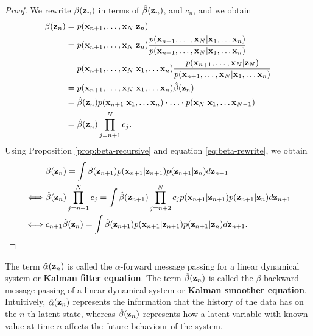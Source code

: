 \documentclass[12pt, oneside]{book}
\numberwithin{equation}{section}
\newcommand{\x}{{\bf x}}
\newcommand{\z}{{\bf z}}
\newtheorem{proposition}{Proposition}[section]
\begin{document}
{\begin{proof}
	We rewrite $\beta(\z_n)$ in terms of $\hat\beta(\z_n)$, and $c_n$, and we obtain
	\begin{align}
		\beta(\z_n) &= p(\x_{n+1}, \ldots, \x_N \vert \z_n)\\
		&= p(\x_{n+1}, \ldots, \x_N \vert \z_n) \frac{p(\x_{n+1}, \ldots, \x_N \vert \x_1, \ldots \x_n)}{p(\x_{n+1}, \ldots, \x_N \vert \x_1, \ldots \x_n)} \\
		&= p(\x_{n+1}, \ldots, \x_N \vert \x_1, \ldots \x_n) \frac{p(\x_{n+1}, \ldots, \x_N \vert \z_N)}{p(\x_{n+1}, \ldots, \x_N \vert \x_1, \ldots \x_n)}\\
		&= p(\x_{n+1}, \ldots, \x_N \vert \x_1, \ldots \x_n) \hat\beta(\z_n)\\
		&= \hat\beta(\z_n) p(\x_{n+1} \vert \x_1, \ldots \x_n) \cdot \ldots \cdot p(\x_{N} \vert \x_1, \ldots \x_{N-1})\\
		&= \hat\beta(\z_n) \prod_{j=n+1}^N c_j \label{eq:beta-rewrite}.
	\end{align}
	Using Proposition \ref{prop:beta-recursive} and equation \eqref{eq:beta-rewrite}, we obtain
	\begin{align}
		&\beta(\z_n) = \int  \beta(\z_{n+1})p(\x_{n+1}\vert \z_{n+1}) p(\z_{n+1}\vert \z_n) d\z_{n+1}\\
		\iff& \hat\beta(\z_n) \prod_{j=n+1}^N c_j = \int \hat\beta(\z_{n+1}) \prod_{j=n+2}^N c_jp(\x_{n+1}\vert \z_{n+1}) p(\z_{n+1}\vert \z_n) d\z_{n+1}\\
		\iff& c_{n+1} \hat\beta(\z_n) = \int  \hat\beta(\z_{n+1}) p(\x_{n+1}\vert \z_{n+1}) p(\z_{n+1}\vert \z_n) d\z_{n+1}.
	\end{align}
\end{proof}

%

The term $\hat\alpha(\z_n)$ is called the $\alpha$-forward message passing for a linear dynamical system or \textbf{Kalman filter equation}.  The term $\hat\beta(\z_n)$ is called the $\beta$-backward message passing of a linear dynamical system or \textbf{Kalman smoother equation}. Intuitively, $\hat\alpha(\z_n)$ represents the information that the history of the data has on the $n$-th latent state, whereas $\hat\beta(\z_n)$ represents how a latent variable with known value at time $n$ affects the future behaviour of the system.

}
\end{document}
